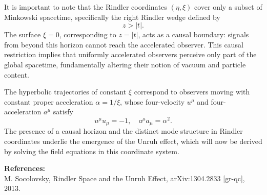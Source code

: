 \begin{technical}
It is important to note that the Rindler coordinates $(\eta, \xi)$ cover only a subset of Minkowski spacetime, specifically the right Rindler wedge defined by
\[
z > |t|.
\]
The surface $\xi = 0$, corresponding to $z = |t|$, acts as a causal boundary: signals from beyond this horizon cannot reach the accelerated observer. This causal restriction implies that uniformly accelerated observers perceive only part of the global spacetime, fundamentally altering their notion of vacuum and particle content.

The hyperbolic trajectories of constant $\xi$ correspond to observers moving with constant proper acceleration $\alpha = 1/\xi$, whose four-velocity $u^\mu$ and four-acceleration $a^\mu$ satisfy
\[
u^\mu u_\mu = -1, \quad a^\mu a_\mu = \alpha^2.
\]
The presence of a causal horizon and the distinct mode structure in Rindler coordinates underlie the emergence of the Unruh effect, which will now be derived by solving the field equations in this coordinate system.

\vspace{0.5em}
\noindent\textbf{References:}\\
M. Socolovsky, Rindler Space and the Unruh Effect, arXiv:1304.2833 [gr-qc], 2013.
\end{technical}